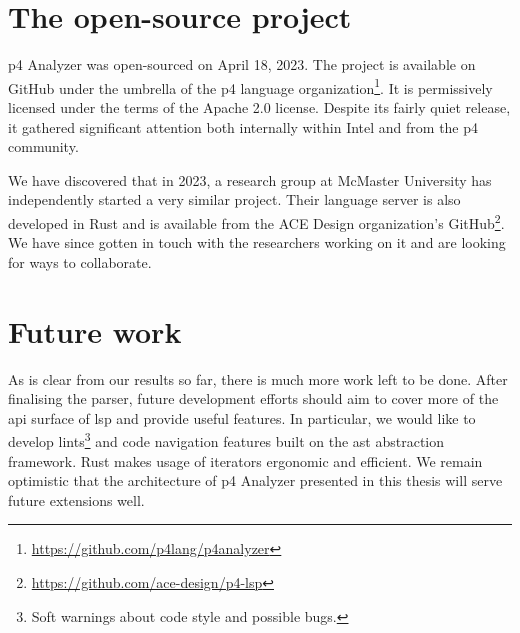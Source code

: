 \section{The open-source project}

\acrshort{p4} Analyzer was open-sourced on April 18, 2023. The project is
available on GitHub under the umbrella of the \acrshort{p4} language
organization\footnote{\url{https://github.com/p4lang/p4analyzer}}. It is
permissively licensed under the terms of the Apache 2.0 license. Despite its
fairly quiet release, it gathered significant attention both internally within
Intel and from the \acrshort{p4} community.

We have discovered that in 2023, a research group at McMaster University has
independently started a very similar project. Their \pfs language server is also
developed in Rust and is available from the ACE Design organization's
GitHub\footnote{\url{https://github.com/ace-design/p4-lsp}}. We have since
gotten in touch with the researchers working on it and are looking for ways to
collaborate.

\section{Future work}

As is clear from our results so far, there is much more work left to be done.
After finalising the parser, future development efforts should aim to cover more
of the \acrshort{api} surface of \acrshort{lsp} and provide useful features. In
particular, we would like to develop lints\footnote{Soft warnings about code
style and possible bugs.} and code navigation features built on the
\acrshort{ast} abstraction framework. Rust makes usage of iterators ergonomic
and efficient. We remain optimistic that the architecture of \acrshort{p4}
Analyzer presented in this thesis will serve future extensions well.
